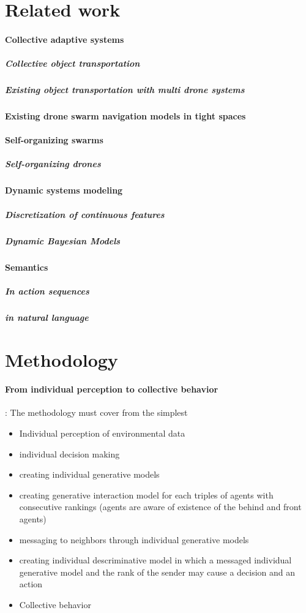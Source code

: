 \documentclass{article}
\begin{document}
	\section{Related work}
		\paragraph{Collective adaptive systems}
			\subparagraph{Collective object transportation}
			\subparagraph{Existing object transportation with multi drone systems}
			\cite{jackson-2020-scalable-cooperative-transport-of-cable-suspended-loads-with-uavs-using-distributed-trajectory-optimization}
		\paragraph{Existing drone swarm navigation models in tight spaces}
			\cite{soria-2020-swarmlab-a-matlab-drone-swarm-simulator}
		\paragraph{Self-organizing swarms}
			\subparagraph{Self-organizing drones}
		\paragraph{Dynamic systems modeling}
			\subparagraph{Discretization of continuous features}
			\subparagraph{Dynamic Bayesian Models}
		
		\paragraph{Semantics}
			\subparagraph{In action sequences}
			\subparagraph{in natural language}
		
	\section{Methodology}
		\paragraph{From individual perception to collective behavior}: The methodology must cover from the simplest  
			\begin{itemize}
				\item Individual perception of environmental data
				\item individual decision making
				\item creating individual generative models
				\item creating generative interaction model for each triples of agents with consecutive rankings (agents are aware of existence of the behind and front agents)
				\item messaging to neighbors through individual generative models
				\item creating individual descriminative model in which a messaged individual generative model and the rank of the sender may cause a decision and an action 
				\item Collective behavior 
			\end{itemize}
	
\end{document}
